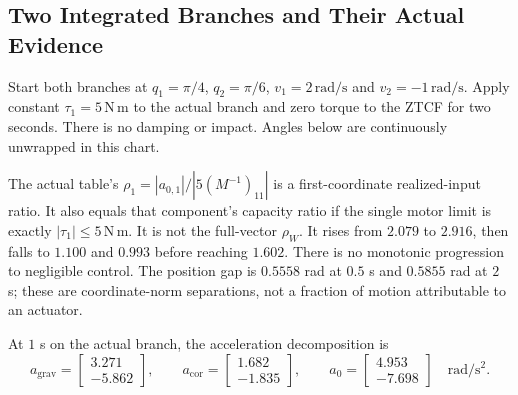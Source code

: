 \subsection{Two Integrated Branches and Their Actual Evidence}
Start both branches at $q_1=\pi/4$, $q_2=\pi/6$, $v_1=2\,\mathrm{rad/s}$ and $v_2=-1\,\mathrm{rad/s}$. Apply constant $\tau_1=5\,\mathrm{N\,m}$ to the actual branch and zero torque to the ZTCF for two seconds. There is no damping or impact. Angles below are continuously unwrapped in this chart.


\begin{table}[htbp]
\centering
\resizebox{\textwidth}{!}{\chsevenTrajectoryTable}
\caption{Actual Trajectory With Constant Base Torque. Angles Are in Radians, Rates in Radians per Second, and Accelerations in Radians per Second Squared. The Final Column Is the First-Coordinate Ratio.}
\label{tab:ch7:double-pendulum-sim}
\end{table}
\begin{table}[htbp]
\centering
\chsevenZtcfTable
\caption{Zero-Torque Trajectory From the Same Initial State. The Final Column Is the Norm of Its Position Difference From the Actual Branch, in Radians.}
\label{tab:ch7:double-pendulum-ZTCF}
\end{table}

The actual table's $\rho_1=|a_{0,1}|/|5(M^{-1})_{11}|$ is a first-coordinate realized-input ratio. It also equals that component's capacity ratio if the single motor limit is exactly $|\tau_1|\leq5\,\mathrm{N\,m}$. It is not the full-vector $\rho_W$. It rises from $2.079$ to $2.916$, then falls to $1.100$ and $0.993$ before reaching $1.602$. There is no monotonic progression to negligible control. The position gap is $0.5558$ rad at $0.5$ s and $0.5855$ rad at $2$ s; these are coordinate-norm separations, not a fraction of motion attributable to an actuator.

At $1$ s on the actual branch, the acceleration decomposition is
\begin{equation}
a_{\mathrm{grav}}=\begin{bmatrix}3.271\\-5.862\end{bmatrix},\qquad
a_{\mathrm{cor}}=\begin{bmatrix}1.682\\-1.835\end{bmatrix},\qquad
a_0=\begin{bmatrix}4.953\\-7.698\end{bmatrix}
\quad\mathrm{rad/s^2}.
\label{eq:ch7:numerical-components}
\end{equation}

